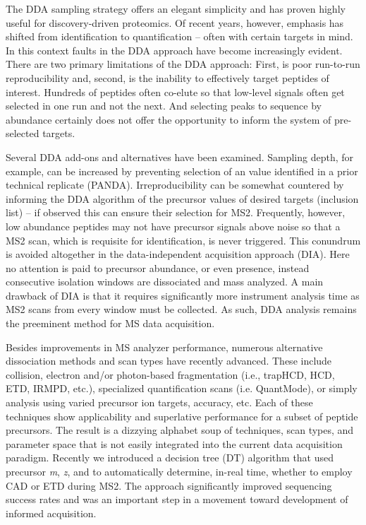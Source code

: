 The DDA sampling strategy offers an elegant simplicity and has proven highly useful for discovery-driven proteomics. Of recent years, however, emphasis has shifted from identification to quantification -- often with certain targets in mind. In this context faults in the DDA approach have become increasingly evident. There are two primary limitations of the DDA approach: First, is poor run-to-run reproducibility and, second, is the inability to effectively target peptides of interest.\cite{randomsampling} Hundreds of peptides often co-elute so that low-level signals often get selected in one run and not the next. And selecting \mz{} peaks to sequence by abundance certainly does not offer the opportunity to inform the system of pre-selected targets.

Several DDA add-ons and alternatives have been examined. Sampling depth, for example, can be increased by preventing selection of an \mz{} value identified in a prior technical replicate (PANDA).\cite{panda} Irreproducibility can be somewhat countered by informing the DDA algorithm of the precursor \mz{} values of desired targets (inclusion list) -- if observed this can ensure their selection for MS2. Frequently, however, low abundance peptides may not have precursor signals above noise so that a MS2 scan, which is requisite for identification, is never triggered. This conundrum is avoided altogether in the data-independent acquisition approach (DIA).\cite{dia} Here no attention is paid to precursor abundance, or even presence, instead consecutive \mz{} isolation windows are dissociated and mass analyzed. A main drawback of DIA is that it requires significantly more instrument analysis time as MS2 scans from every \mz{} window must be collected.\cite{ocean} As such, DDA analysis remains the preeminent method for MS data acquisition.

Besides improvements in MS analyzer performance, numerous alternative dissociation methods and scan types have recently advanced. These include collision, electron and/or photon-based fragmentation (i.e., trapHCD, HCD, ETD, IRMPD, etc.), specialized quantification scans (i.e. QuantMode), or simply analysis using varied precursor ion targets, \mz{} accuracy, etc.\cite{traphcd,hcd,etd,irmpd,quantmode,twostage} Each of these techniques show applicability and superlative performance for a subset of peptide precursors. The result is a dizzying alphabet soup of techniques, scan types, and parameter space that is not easily integrated into the current data acquisition paradigm. Recently we introduced a decision tree (DT) algorithm that used precursor \textit{m}, \textit{z}, and \mz{} to automatically determine, in-real time, whether to employ CAD or ETD during MS2.\cite{dtree} The approach significantly improved sequencing success rates and was an important step in a movement toward development of informed acquisition.


